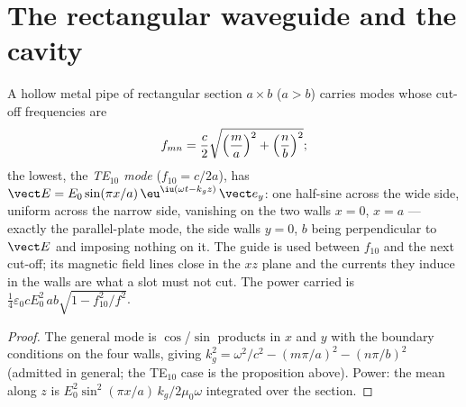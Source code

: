 \section{The rectangular waveguide and the cavity}

\begin{proposition}\label{prop:b2:guided-waves:rectangular}
A hollow metal pipe of rectangular section $a \times b$ ($a > b$) carries
modes whose cut-off frequencies are
\[
f_{mn} = \frac c2\sqrt{\Bigl(\frac ma\Bigr)^2 + \Bigl(\frac nb\Bigr)^2} ;
\]
the lowest, the \emph{TE$_{10}$ mode} ($f_{10} = c/2a$), has $\vect E = E_0\sin
(\pi x/a)\,\eu^{\iu(\omega t - k_gz)}\,\vect e_y$: one half-sine across the wide
side, uniform across the narrow side, vanishing on the two walls $x = 0$,
$x = a$ --- exactly the parallel-plate mode, the side walls $y = 0$, $b$
being perpendicular to $\vect E$ and imposing nothing on it. The guide is
used between $f_{10}$ and the next cut-off; its magnetic field lines
close in the $xz$ plane and the currents they induce in the walls are
what a slot must not cut. The power carried is $\tfrac14\varepsilon_0cE_0^2\,ab
\sqrt{1 - f_{10}^2/f^2}$.
\end{proposition}

\begin{proof}
The general mode is $\cos$/$\sin$ products in $x$ and $y$ with the
boundary conditions on the four walls, giving $k_g^2 = \omega^2/c^2 - (m\pi/a)^2
- (n\pi/b)^2$ (admitted in general; the TE$_{10}$ case is the proposition
above). Power: the mean  along $z$ is $E_0^2\sin^2(\pi x/a)
\,k_g/2\mu_0\omega$ integrated over the section.
\end{proof}

